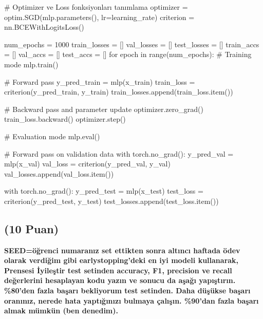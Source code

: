 \documentclass[11pt]{article}
\begin{document}
\begin{python}
# Optimizer ve Loss fonksiyonları tanımlama
optimizer = optim.SGD(mlp.parameters(), lr=learning_rate)
criterion = nn.BCEWithLogitsLoss()

num_epochs = 1000
train_losses = []
val_losses = []
test_losses = []
train_accs = []
val_accs = []
test_accs = []
for epoch in range(num_epochs):
    # Training mode
    mlp.train()
    
    # Forward pass
    y_pred_train = mlp(x_train)
    train_loss = criterion(y_pred_train, y_train)
    train_losses.append(train_loss.item())

    # Backward pass and parameter update
    optimizer.zero_grad()
    train_loss.backward()
    optimizer.step()

    # Evaluation mode
    mlp.eval()

    # Forward pass on validation data
    with torch.no_grad():
        y_pred_val = mlp(x_val)
        val_loss = criterion(y_pred_val, y_val)
        val_losses.append(val_loss.item())

    with torch.no_grad():
        y_pred_test = mlp(x_test)
        test_loss = criterion(y_pred_test, y_test)
        test_losses.append(test_loss.item())
\end{python}

\begin{comment}
\begin{figure}[ht!]
    \centering
    \texttt{[image: mypicturehere.png]}
    \caption{Buraya açıklama yazın}
    \label{fig:my_pic}
\end{figure}
\end{comment}

\subsection{(10 Puan)} \textbf{SEED=öğrenci numaranız set ettikten sonra altıncı haftada ödev olarak verdiğim gibi earlystopping'deki en iyi modeli kullanarak, Prensesi İyileştir test setinden accuracy, F1, precision ve recall değerlerini hesaplayan kodu yazın ve sonucu da aşağı yapıştırın. \%80'den fazla başarı bekliyorum test setinden. Daha düşükse başarı oranınız, nerede hata yaptığınızı bulmaya çalışın. \%90'dan fazla başarı almak mümkün (ben denedim).}
\end{document}
